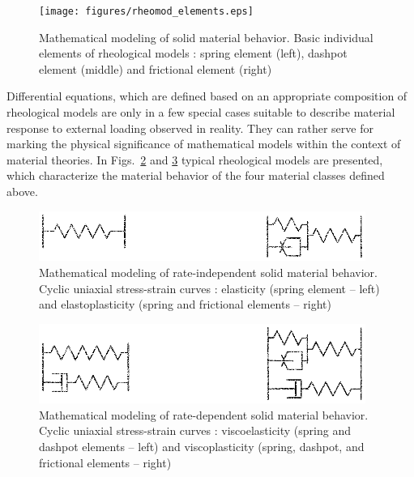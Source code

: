 \newpage

\begin{figure}[htb!]
\begin{center}
\footnotesize
\texttt{[image: figures/rheomod\_elements.eps]}
\caption{Mathematical modeling of solid material behavior. Basic individual elements of rheological models \cite{JCZ:2007}: spring element (left), dashpot element (middle) and frictional element (right)}
\label{fig:rheomod_elem}
\end{center}
\end{figure}

Differential equations, which are defined based on an appropriate composition of rheological models are only in a few special cases suitable to describe material response to external loading observed in reality. They can rather serve for marking the physical significance of mathematical models within the context of material theories. In Figs.~\ref{fig:rheomod_el_elpl} and \ref{fig:rheomod_vel_vpl} typical rheological models are presented, which characterize the material behavior of the four material classes defined above.

\begin{figure}[htb!]
\begin{center}
\footnotesize
\includegraphics[width=0.95\textwidth]{figures/rheomod_el_elpl.eps}
\caption{Mathematical modeling of rate-independent solid material behavior. Cyclic uniaxial stress-strain curves \cite{Haupt:2002}: elasticity (spring element -- left) and elastoplasticity (spring and frictional elements -- right)}
\label{fig:rheomod_el_elpl}
\end{center}
\end{figure}

\begin{figure}[htb!]
\begin{center}
\footnotesize
\includegraphics[width=0.95\textwidth]{figures/rheomod_vel_vpl.eps}
\caption{Mathematical modeling of rate-dependent solid material behavior. Cyclic uniaxial stress-strain curves \cite{Haupt:2002}: viscoelasticity (spring and dashpot elements -- left) and viscoplasticity (spring, dashpot, and frictional elements -- right)}
\label{fig:rheomod_vel_vpl}
\end{center}
\end{figure}

